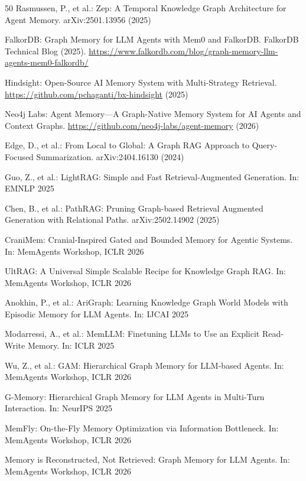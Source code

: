 \documentclass[hf]{ceurart}
\begin{document}
\begin{thebibliography}{50}
Rasmussen, P., et al.: Zep: A Temporal Knowledge Graph Architecture
for Agent Memory. arXiv:2501.13956 (2025)

FalkorDB: Graph Memory for LLM Agents with Mem0 and FalkorDB.
FalkorDB Technical Blog (2025).
\url{https://www.falkordb.com/blog/graph-memory-llm-agents-mem0-falkordb/}

Hindsight: Open-Source AI Memory System with Multi-Strategy Retrieval.
\url{https://github.com/pchaganti/bx-hindsight} (2025)

Neo4j Labs: Agent Memory---A Graph-Native Memory System for AI Agents
and Context Graphs. \url{https://github.com/neo4j-labs/agent-memory}
(2026)

Edge, D., et al.: From Local to Global: A Graph RAG Approach to
Query-Focused Summarization. arXiv:2404.16130 (2024)

Guo, Z., et al.: LightRAG: Simple and Fast Retrieval-Augmented
Generation. In: EMNLP 2025

Chen, B., et al.: PathRAG: Pruning Graph-based Retrieval Augmented
Generation with Relational Paths. arXiv:2502.14902 (2025)

CraniMem: Cranial-Inspired Gated and Bounded Memory for Agentic
Systems. In: MemAgents Workshop, ICLR 2026

UltRAG: A Universal Simple Scalable Recipe for Knowledge Graph RAG.
In: MemAgents Workshop, ICLR 2026

Anokhin, P., et al.: AriGraph: Learning Knowledge Graph World Models
with Episodic Memory for LLM Agents. In: IJCAI 2025

Modarressi, A., et al.: MemLLM: Finetuning LLMs to Use an Explicit
Read-Write Memory. In: ICLR 2025

Wu, Z., et al.: GAM: Hierarchical Graph Memory for LLM-based
Agents. In: MemAgents Workshop, ICLR 2026

G-Memory: Hierarchical Graph Memory for LLM Agents in Multi-Turn
Interaction. In: NeurIPS 2025

MemFly: On-the-Fly Memory Optimization via Information Bottleneck.
In: MemAgents Workshop, ICLR 2026

Memory is Reconstructed, Not Retrieved: Graph Memory for LLM Agents.
In: MemAgents Workshop, ICLR 2026


\end{thebibliography}
\end{document}
